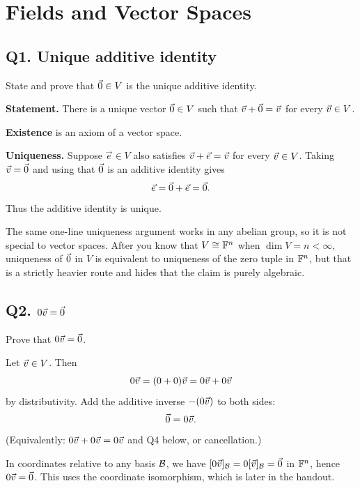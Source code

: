 \section{Fields and Vector Spaces}

\subsection{Q1. Unique additive identity}

\begin{promptbox}
State and prove that $\vec{0}\in V$ is the unique additive identity.
\end{promptbox}

\begin{coursebox}
\textbf{Statement.}
There is a unique vector $\vec{0}\in V$ such that $\vec{v}+\vec{0}=\vec{v}$ for every $\vec{v}\in V$.

\textbf{Existence} is an axiom of a vector space.

\textbf{Uniqueness.}
Suppose $\vec{e}\in V$ also satisfies $\vec{v}+\vec{e}=\vec{v}$ for every $\vec{v}\in V$.
Taking $\vec{v}=\vec{0}$ and using that $\vec{0}$ is an additive identity gives
\[
\vec{e}
=\vec{0}+\vec{e}
=\vec{0}.
\]
Thus the additive identity is unique.
\end{coursebox}

\begin{laterbox}
The same one-line uniqueness argument works in any abelian group, so it is not
special to vector spaces. After you know that $V\cong\mathbb{F}^n$ when $\dim V=n<\infty$,
uniqueness of $\vec{0}$ in $V$ is equivalent to uniqueness of the zero tuple in
$\mathbb{F}^n$, but that is a strictly heavier route and hides that the claim is purely
algebraic.
\end{laterbox}

\subsection{Q2. $0\vec{v}=\vec{0}$}

\begin{promptbox}
Prove that $0\vec{v}=\vec{0}$.
\end{promptbox}

\begin{coursebox}
Let $\vec{v}\in V$. Then
\[
0\vec{v}=(0+0)\vec{v}=0\vec{v}+0\vec{v}
\]
by distributivity. Add the additive inverse $-(0\vec{v})$ to both sides:
\[
\vec{0}=0\vec{v}.
\]
(Equivalently: $0\vec{v}+0\vec{v}=0\vec{v}$ and Q4 below, or cancellation.)
\end{coursebox}

\begin{laterbox}
In coordinates relative to any basis $\mathcal{B}$, we have $[0\vec{v}]_{\mathcal{B}}=0[\vec{v}]_{\mathcal{B}}=\vec{0}$
in $\mathbb{F}^n$, hence $0\vec{v}=\vec{0}$. This uses the coordinate isomorphism, which is
later in the handout.
\end{laterbox}

